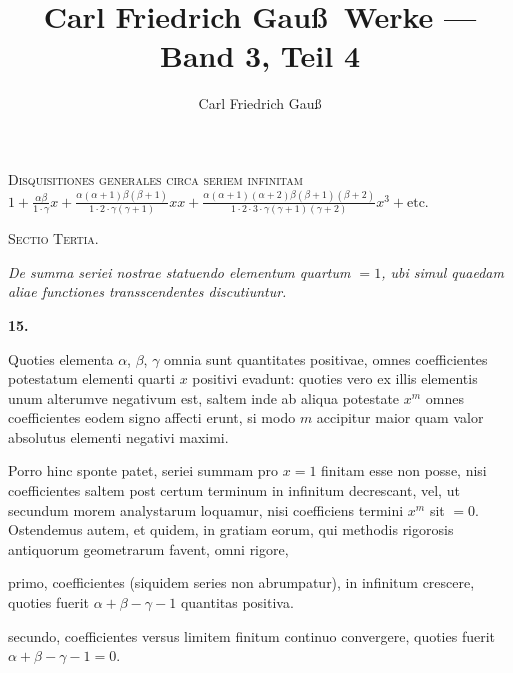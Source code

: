 \documentclass[12pt,a4paper]{article}
\title{Carl Friedrich Gau\ss\ Werke --- Band 3, Teil 4}
\author{Carl Friedrich Gau\ss}
\date{}
\newcommand{\art}[1]{\par\medskip\noindent\textbf{#1.}\par\nopagebreak\smallskip}
\begin{document}
\maketitle
\thispagestyle{empty}

\begin{center}
\Large\textsc{Disquisitiones generales circa seriem infinitam}\\[0.5em]
\large
$1 + \frac{\alpha\beta}{1\cdot\gamma}x + \frac{\alpha(\alpha+1)\beta(\beta+1)}{1\cdot2\cdot\gamma(\gamma+1)}xx + \frac{\alpha(\alpha+1)(\alpha+2)\beta(\beta+1)(\beta+2)}{1\cdot2\cdot3\cdot\gamma(\gamma+1)(\gamma+2)}x^3 + \text{etc.}$
\end{center}

\vspace{1em}

\begin{center}
\textsc{Sectio Tertia.}
\end{center}

\begin{center}
\textit{De summa seriei nostrae statuendo elementum quartum $=1$, ubi simul quaedam aliae functiones transscendentes discutiuntur.}
\end{center}

\vspace{1em}

\art{15}

Quoties elementa $\alpha$, $\beta$, $\gamma$ omnia sunt quantitates positivae, omnes coefficientes potestatum elementi quarti $x$ positivi evadunt: quoties vero ex illis elementis unum alterumve negativum est, saltem inde ab aliqua potestate $x^m$ omnes coefficientes eodem signo affecti erunt, si modo $m$ accipitur maior quam valor absolutus elementi negativi maximi.

Porro hinc sponte patet, seriei summam pro $x=1$ finitam esse non posse, nisi coefficientes saltem post certum terminum in infinitum decrescant, vel, ut secundum morem analystarum loquamur, nisi coefficiens termini $x^m$ sit $=0$. Ostendemus autem, et quidem, in gratiam eorum, qui methodis rigorosis antiquorum geometrarum favent, omni rigore,

primo, coefficientes (siquidem series non abrumpatur), in infinitum crescere, quoties fuerit $\alpha+\beta-\gamma-1$ quantitas positiva.

secundo, coefficientes versus limitem finitum continuo convergere, quoties fuerit $\alpha+\beta-\gamma-1=0$.
\end{document}
